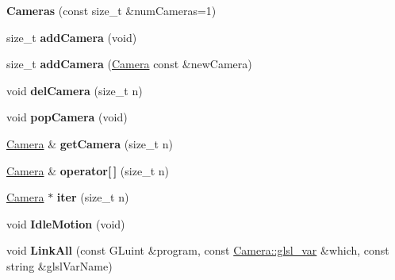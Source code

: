 \begin{DoxyCompactItemize}
\item 
\hypertarget{class_cameras_a35c195ae1a970836e7192bac0f34fb54}{{\bfseries Cameras} (const size\-\_\-t \&num\-Cameras=1)}\label{class_cameras_a35c195ae1a970836e7192bac0f34fb54}

\item 
\hypertarget{class_cameras_ae6eb54cc68dd582db6f808a603031c56}{size\-\_\-t {\bfseries add\-Camera} (void)}\label{class_cameras_ae6eb54cc68dd582db6f808a603031c56}

\item 
\hypertarget{class_cameras_ac5292f6f0d6c151390e5564548b72935}{size\-\_\-t {\bfseries add\-Camera} (\hyperlink{class_camera}{Camera} const \&new\-Camera)}\label{class_cameras_ac5292f6f0d6c151390e5564548b72935}

\item 
\hypertarget{class_cameras_aaa690f1a47ebe431dbda55fba958ca38}{void {\bfseries del\-Camera} (size\-\_\-t n)}\label{class_cameras_aaa690f1a47ebe431dbda55fba958ca38}

\item 
\hypertarget{class_cameras_a9dee7bf1f2c56176c461fa2617ce4549}{void {\bfseries pop\-Camera} (void)}\label{class_cameras_a9dee7bf1f2c56176c461fa2617ce4549}

\item 
\hypertarget{class_cameras_a0e5181cf91f009ae2709533f2184ddb0}{\hyperlink{class_camera}{Camera} \& {\bfseries get\-Camera} (size\-\_\-t n)}\label{class_cameras_a0e5181cf91f009ae2709533f2184ddb0}

\item 
\hypertarget{class_cameras_aeee13e4cc6eb085a65af9ef6bf3a549a}{\hyperlink{class_camera}{Camera} \& {\bfseries operator\mbox{[}$\,$\mbox{]}} (size\-\_\-t n)}\label{class_cameras_aeee13e4cc6eb085a65af9ef6bf3a549a}

\item 
\hypertarget{class_cameras_a91bd6744be5f876bd74e65134da8653a}{\hyperlink{class_camera}{Camera} $\ast$ {\bfseries iter} (size\-\_\-t n)}\label{class_cameras_a91bd6744be5f876bd74e65134da8653a}

\item 
\hypertarget{class_cameras_acb3907c96b7d147b7bcc1aad42f8da6f}{void {\bfseries Idle\-Motion} (void)}\label{class_cameras_acb3907c96b7d147b7bcc1aad42f8da6f}

\item 
\hypertarget{class_cameras_a5300fe1aefc42b41151dbb55aff1c978}{void {\bfseries Link\-All} (const G\-Luint \&program, const \hyperlink{class_camera_a6ff726a75a430e4f17e5dec42e4d4405}{Camera\-::glsl\-\_\-var} \&which, const string \&glsl\-Var\-Name)}\label{class_cameras_a5300fe1aefc42b41151dbb55aff1c978}


\end{DoxyCompactItemize}
